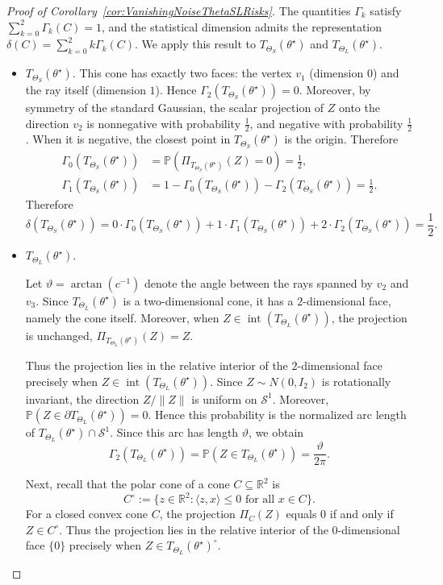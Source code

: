 \documentclass[11pt]{article}
\theoremstyle{plain}
\theoremstyle{definition}
\providecommand{\mathbbm}{\mathbb} %
\newcommand{\R}{\mathbbm{R}}
\renewcommand{\P}{\mathbb{P}}
\newcommand{\mcS}{\mathcal{S}}
\begin{document}
\begin{proof}[Proof of Corollary~\ref{cor:VanishingNoiseThetaSLRisks}]
The quantities $\Gamma_k$ satisfy $\sum_{k=0}^2 \Gamma_k(C)=1$, and the statistical dimension admits the
representation $\delta(C)=\sum_{k=0}^2 k \Gamma_k(C)$. We apply this result to
$T_{\Theta_S}(\theta^\star)$ and $T_{\Theta_L}(\theta^\star)$.
\begin{itemize}
    \item $T_{\Theta_S}(\theta^\star)$. This cone has exactly two faces: the vertex $v_1$ (dimension $0$) and the ray itself (dimension $1$). Hence $\Gamma_2 (T_{\Theta_S}(\theta^\star))=0$. Moreover, by symmetry of the standard Gaussian, the scalar projection of $Z$ onto the direction $v_2$ is nonnegative with probability $\frac12$, and negative with probability $\frac12$. When it is negative, the closest point in $T_{\Theta_S}(\theta^\star)$ is the origin. Therefore
    \begin{align*}
    \Gamma_0(T_{\Theta_S}(\theta^\star))&=\P(\Pi_{T_{\Theta_S}(\theta^\star)}(Z)=0)=\frac12,\\ \Gamma_1(T_{\Theta_S}(\theta^\star))&=1-\Gamma_0(T_{\Theta_S}(\theta^\star))-\Gamma_2 (T_{\Theta_S}(\theta^\star))=\frac12.
    \end{align*}
    Therefore 
    \[
    \delta(T_{\Theta_S}(\theta^\star))=0\cdot \Gamma_0(T_{\Theta_S}(\theta^\star))+1\cdot \Gamma_1(T_{\Theta_S}(\theta^\star))+2\cdot \Gamma_2 (T_{\Theta_S}(\theta^\star))=\frac12.
    \]

\item $T_{\Theta_L}(\theta^\star)$. 

Let $\vartheta = \arctan (c^{-1})$ denote the angle between the rays spanned
by $v_2$ and $v_3$. Since $T_{\Theta_L}(\theta^\star)$ is a
two-dimensional cone, it has a $2$-dimensional face, namely the cone itself.
Moreover, when $Z\in \operatorname{int}(T_{\Theta_L}(\theta^\star))$, the
projection is unchanged, $\Pi_{T_{\Theta_L}(\theta^\star)}(Z)=Z$.

Thus the projection lies in the relative interior of the $2$-dimensional face
precisely when $Z\in \operatorname{int}(T_{\Theta_L}(\theta^\star))$. Since
$Z\sim N(0,I_2)$ is rotationally invariant, the direction
$Z/\|Z\|$ is uniform on $\mcS^1$. Moreover,
$\mathbb P(Z\in \partial T_{\Theta_L}(\theta^\star))=0$. Hence this
probability is the normalized arc length of
$T_{\Theta_L}(\theta^\star)\cap\mcS^1$. Since this arc has length
$\vartheta$, we obtain
\[
\Gamma_2 (T_{\Theta_L}(\theta^\star))
=
\mathbb{P}(Z\in T_{\Theta_L}(\theta^\star))
=
\frac{\vartheta}{2\pi}.
\]


Next, recall that the polar cone of a cone $C\subseteq \R^2$ is
\[
    C^\circ
    :=
    \{z\in\R^2:\langle z,x\rangle\le0
    \text{ for all }x\in C\}.
\]
For a closed convex cone $C$, the projection $\Pi_C(Z)$ equals $0$ if
and only if $Z\in C^\circ$. Thus the projection lies in the relative interior
of the $0$-dimensional face $\{0\}$ precisely when
$Z\in T_{\Theta_L}(\theta^\star)^\circ$. 
  

\end{itemize}
\end{proof}
\end{document}
